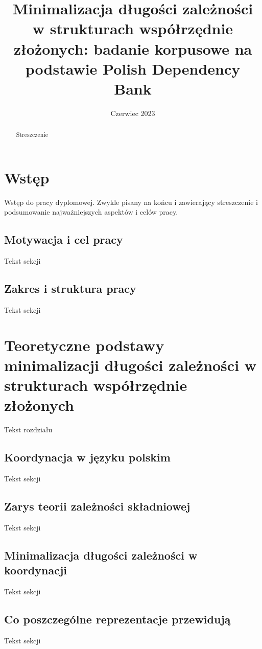 \documentclass[licencjacka]{pracamgr}
\title{Minimalizacja długości zależności w strukturach współrzędnie złożonych: badanie korpusowe na podstawie Polish Dependency Bank}
\date{Czerwiec 2023}
\begin{document}
\maketitle


\begin{abstract}
Streszczenie
\end{abstract}

\thispagestyle{empty}
\setcounter{page}{3}
\tableofcontents 

\chapter*{Wstęp}
Wstęp do pracy dyplomowej. Zwykle pisany na końcu i zawierający streszczenie i podsumowanie najważniejszych aspektów i celów pracy.
\section*{Motywacja i cel pracy}
Tekst sekcji
\section*{Zakres i struktura pracy}
Tekst sekcji


\setcounter{chapter}{1}
\chapter{Teoretyczne podstawy minimalizacji długości zależności w strukturach współrzędnie złożonych}
Tekst rozdziału
\section{Koordynacja w języku polskim}
Tekst sekcji
\section{Zarys teorii zależności składniowej}
Tekst sekcji
\section{Minimalizacja długości zależności w koordynacji}
Tekst sekcji
\section{Co poszczególne reprezentacje przewidują}
Tekst sekcji
\end{document}
